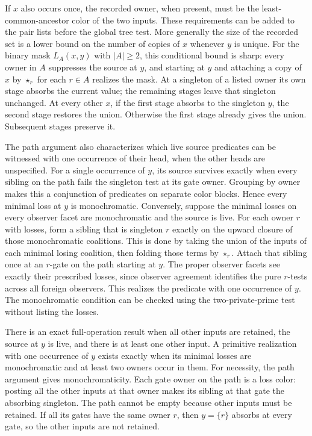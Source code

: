 If $x$ also occurs once, the recorded owner, when present,
must be the least-common-ancestor color of the two inputs.
These requirements can be added to the pair lists before the
global tree test. More generally the size of the recorded set
is a lower bound on the number of copies of $x$ whenever $y$
is unique. For the binary mask $L_A(x,y)$ with $|A|\geq2$, this
conditional bound is sharp: every owner in $A$ suppresses the source at
$y$, and starting at $y$ and attaching a copy of $x$ by
$\star_r$ for each $r\in A$ realizes the mask. At a singleton
of a listed owner its own stage absorbs the current value;
the remaining stages leave that singleton unchanged. At every
other $x$, if the first stage absorbs to the singleton $y$,
the second stage restores the union. Otherwise the first stage
already gives the union. Subsequent stages preserve it.

The path argument also characterizes which live source predicates
can be witnessed with one occurrence of their head, when the
other heads are unspecified. For a single occurrence of $y$,
its source survives exactly when every sibling on the path
fails the singleton test at its gate owner. Grouping by owner
makes this a conjunction of predicates on separate color blocks.
Hence every minimal loss at $y$ is monochromatic. Conversely,
suppose the minimal losses on every observer facet are
monochromatic and the source is live. For each owner $r$ with
losses, form a sibling that is singleton $r$ exactly on the
upward closure of those monochromatic coalitions. This is done
by taking the union of the inputs of each minimal losing
coalition, then folding those terms by $\star_r$. Attach that
sibling once at an $r$-gate on the path starting at $y$.
The proper observer facets see exactly their prescribed losses,
since observer agreement identifies the pure $r$-tests across
all foreign observers. This realizes the predicate with one
occurrence of $y$. The monochromatic condition can be checked
using the two-private-prime test without listing the losses.

There is an exact full-operation result when all other inputs
are retained, the source at $y$ is live, and there is at least
one other input. A primitive realization with one occurrence of
$y$ exists exactly when its minimal losses are monochromatic
and at least two owners occur in them. For necessity, the path
argument gives monochromaticity. Each gate owner on the path
is a loss color: posting all the other inputs at that owner
makes its sibling at that gate the absorbing singleton. The
path cannot be empty because other inputs must be retained.
If all its gates have the same owner $r$, then $y=\{r\}$
absorbs at every gate, so the other inputs are not retained.

